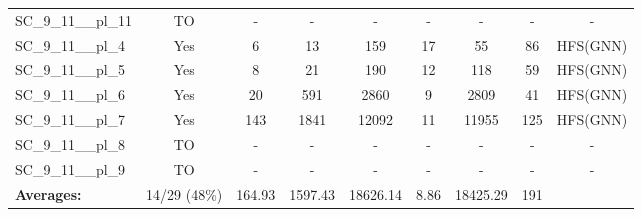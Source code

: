 \documentclass{article}
\begin{document}
\begin{tabular}{lcccccccc}
SC\_9\_11\_\_pl\_11 & TO & - & - & - & - & - & - & - \\
SC\_9\_11\_\_pl\_4 & Yes & 6 & 13 & 159 & 17 & 55 & 86 & HFS(GNN) \\
SC\_9\_11\_\_pl\_5 & Yes & 8 & 21 & 190 & 12 & 118 & 59 & HFS(GNN) \\
SC\_9\_11\_\_pl\_6 & Yes & 20 & 591 & 2860 & 9 & 2809 & 41 & HFS(GNN) \\
SC\_9\_11\_\_pl\_7 & Yes & 143 & 1841 & 12092 & 11 & 11955 & 125 & HFS(GNN) \\
SC\_9\_11\_\_pl\_8 & TO & - & - & - & - & - & - & - \\
SC\_9\_11\_\_pl\_9 & TO & - & - & - & - & - & - & - \\
\textbf{Averages:} & 14/29 (48\%) & 164.93 & 1597.43 & 18626.14 & 8.86 & 18425.29 & 191 & \\
\bottomrule
\end{tabular}
\\[0.7cm]
\end{document}
